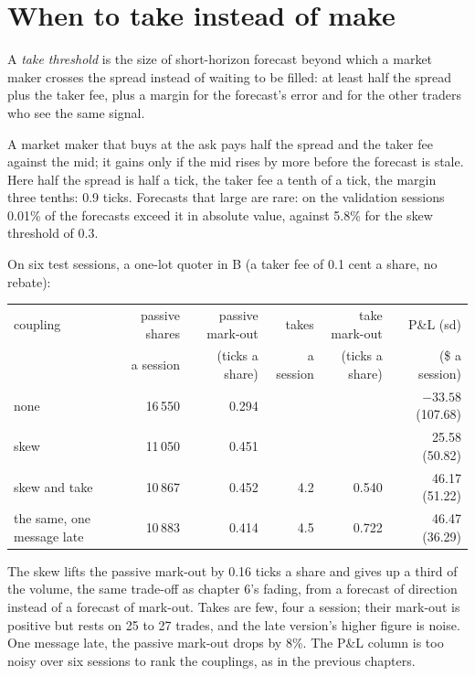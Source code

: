 \section{When to take instead of make}

\begin{definition}\label{def:hf:short-horizon-alpha:take}
A \emph{take threshold} is the size of short-horizon forecast beyond which a market maker crosses the spread instead of
waiting to be filled: at least half the spread plus the taker fee, plus a margin for the forecast's error and for the other traders who see the same
signal.
\end{definition}

A market maker that buys at the ask pays half the spread and the taker fee against the mid; it gains only if the mid rises by more before the forecast
is stale. Here half the spread is half a tick, the taker fee a tenth of a tick, the margin three tenths: 0.9 ticks. Forecasts that large are rare:
on the validation sessions 0.01\% of the forecasts exceed it in absolute value, against 5.8\% for the skew threshold of 0.3.

On six test sessions, a one-lot quoter in B (a taker fee of 0.1 cent a share, no rebate):

\begin{center}
\footnotesize
\begin{tabular}{@{}lrrrrr@{}}
\toprule
coupling & passive shares & passive mark-out & takes & take mark-out & P\&L (sd)\\
& a session & (ticks a share) & a session & (ticks a share) & (\$ a session)\\
\midrule
none & 16\,550 & 0.294 & & & $-33.58$ (107.68)\\
skew & 11\,050 & 0.451 & & & 25.58 (50.82)\\
skew and take & 10\,867 & 0.452 & 4.2 & 0.540 & 46.17 (51.22)\\
the same, one message late & 10\,883 & 0.414 & 4.5 & 0.722 & 46.47 (36.29)\\
\bottomrule
\end{tabular}
\end{center}

The skew lifts the passive mark-out by 0.16 ticks a share and gives up a third of the volume, the same trade-off as chapter 6's fading, from a
forecast of direction instead of a forecast of mark-out. Takes are few, four a session; their mark-out is positive but rests on 25 to 27 trades, and
the late version's higher figure is noise. One message late, the passive mark-out drops by 8\%. The P\&L column is too noisy over six sessions to rank
the couplings, as in the previous chapters.

